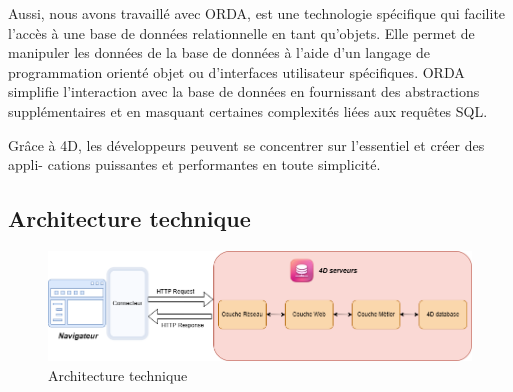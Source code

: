 Aussi, nous avons travaillé avec ORDA, est une technologie spécifique qui facilite l’accès à une base de données relationnelle en tant qu’objets. Elle permet de manipuler les données de la base de données à l’aide d’un langage de programmation orienté objet ou d’interfaces utilisateur spécifiques. ORDA simplifie l’interaction avec la base de données en fournissant des abstractions supplémentaires et en masquant certaines complexités liées aux requêtes SQL.
\newline

Grâce à 4D, les développeurs peuvent se concentrer sur l’essentiel et créer des appli- cations puissantes et performantes en toute simplicité.




\subsection{Architecture technique}

\begin{figure}[htbp]
   \centering
   \includegraphics[scale=0.6]{Images/techn.png} %
   \caption{Architecture technique}
   \label{fig:seq4}
\end{figure}

